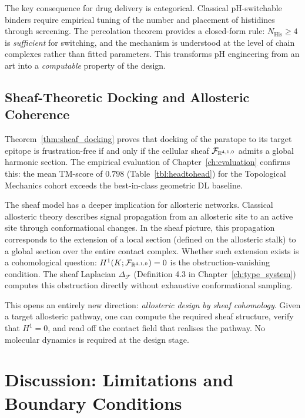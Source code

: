The key consequence for drug delivery is categorical.  Classical pH-switchable
binders require empirical tuning of the number and placement of histidines
through screening.  The percolation theorem provides a closed-form rule:
$N_{\text{His}} \ge 4$ is \emph{sufficient} for switching, and the mechanism
is understood at the level of chain complexes rather than fitted parameters.
This transforms pH engineering from an art into a \emph{computable} property
of the design.

\subsection{Sheaf-Theoretic Docking and Allosteric Coherence}
\label{subsec:sheaf_implications}

Theorem~\ref{thm:sheaf_docking} proves that docking of the \PLQ{} paratope to
its target epitope is frustration-free if and only if the cellular sheaf
$\mathcal{F}_{\mathbb{R}^{4,1,0}}$ admits a global harmonic section.  The empirical
evaluation of Chapter~\ref{ch:evaluation} confirms this: the mean TM-score of
$0.798$ (Table~\ref{tbl:headtohead}) for the Topological Mechanics cohort
exceeds the best-in-class geometric DL baseline.

The sheaf model has a deeper implication for allosteric networks.  Classical
allosteric theory describes signal propagation from an allosteric site to an
active site through conformational changes.  In the sheaf picture, this
propagation corresponds to the extension of a local section (defined on the
allosteric stalk) to a global section over the entire contact complex.  Whether
such extension exists is a cohomological question: $H^1(K;
\mathcal{F}_{\mathbb{R}^{4,1,0}}) = 0$ is the obstruction-vanishing condition.  The sheaf
Laplacian $\Delta_{\mathcal{F}}$ (Definition 4.3 in
Chapter~\ref{ch:type_system}) computes this obstruction directly without
exhaustive conformational sampling.

This opens an entirely new direction: \emph{allosteric design by sheaf
cohomology}.  Given a target allosteric pathway, one can compute the required
sheaf structure, verify that $H^1 = 0$, and read off the contact field that
realises the pathway.  No molecular dynamics is required at the design stage.

\section{Discussion: Limitations and Boundary Conditions}
\label{sec:limitations}

